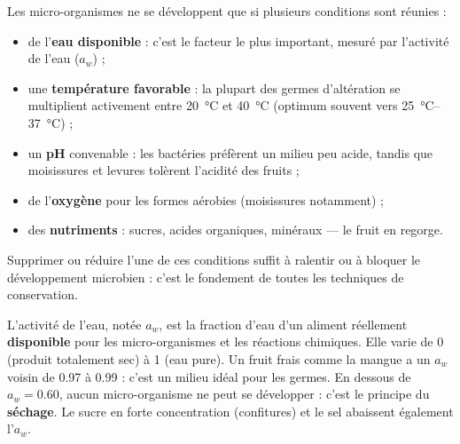 \documentclass[11pt]{article}
\newcommand{\cle}[1]{{\popxbold\color{popdark}#1}}
\begin{document}
\begin{propriete}
Les micro-organismes ne se développent que si plusieurs conditions sont réunies :
\begin{itemize}
\item de l'\textbf{eau disponible} : c'est le facteur le plus important, mesuré par l'\cle{activité de l'eau} ($a_w$) ;
\item une \textbf{température favorable} : la plupart des germes d'altération se multiplient activement entre \SI{20}{\celsius} et \SI{40}{\celsius} (optimum souvent vers \SIrange{25}{37}{\celsius}) ;
\item un \textbf{pH} convenable : les bactéries préfèrent un milieu peu acide, tandis que moisissures et levures tolèrent l'acidité des fruits ;
\item de l'\textbf{oxygène} pour les formes aérobies (moisissures notamment) ;
\item des \textbf{nutriments} : sucres, acides organiques, minéraux — le fruit en regorge.
\end{itemize}
Supprimer ou réduire l'une de ces conditions suffit à ralentir ou à bloquer le développement microbien : c'est le fondement de toutes les techniques de conservation.
\end{propriete}

\begin{definition}
L'\cle{activité de l'eau}, notée $a_w$, est la fraction d'eau d'un aliment réellement \textbf{disponible} pour les micro-organismes et les réactions chimiques. Elle varie de 0 (produit totalement sec) à 1 (eau pure). Un fruit frais comme la mangue a un $a_w$ voisin de \num{0,97} à \num{0,99} : c'est un milieu idéal pour les germes. En dessous de $a_w = \num{0,60}$, aucun micro-organisme ne peut se développer : c'est le principe du \textbf{séchage}. Le sucre en forte concentration (confitures) et le sel abaissent également l'$a_w$.
\end{definition}
\end{document}
